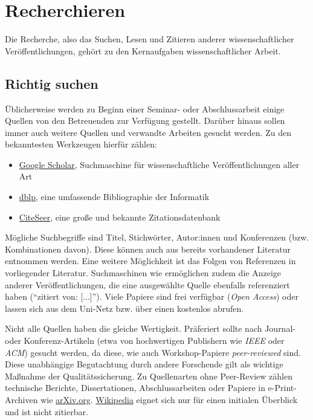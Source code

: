 \section{Recherchieren}%
\label{sec:Recherchieren}

Die Recherche, also das Suchen, Lesen und Zitieren anderer wissenschaftlicher Veröffentlichungen, gehört zu den Kernaufgaben wissenschaftlicher Arbeit.

\subsection{Richtig suchen}%
\label{sec:Recherchieren:Suchen}

Üblicherweise werden zu Beginn einer Seminar- oder Abschlussarbeit einige Quellen von den Betreuenden zur Verfügung gestellt.
Darüber hinaus sollen immer auch weitere Quellen und verwandte Arbeiten gesucht werden.
Zu den bekanntesten Werkzeugen hierfür zählen:

\smallskip
\begin{itemize}[label={\symbolTool}]
    \item \href{https://scholar.google.com/}{Google Scholar}, Suchmaschine für wissenschaftliche Veröffentlichungen aller Art
    \item \href{https://dblp.org/}{dblp}, eine umfassende Bibliographie der Informatik
    \item \href{https://citeseerx.ist.psu.edu/}{CiteSeer}, eine große und bekannte Zitationsdatenbank
\end{itemize}
\smallskip

\noindent
Mögliche Suchbegriffe sind Titel, Stichwörter, Autor:innen und Konferenzen (bzw. Kombinationen davon).
Diese können auch aus bereits vorhandener Literatur entnommen werden.
Eine weitere Möglichkeit ist das Folgen von Referenzen in vorliegender Literatur.
Suchmaschinen wie  ermöglichen zudem die Anzeige anderer Veröffentlichungen, die eine ausgewählte Quelle ebenfalls referenziert haben (\enquote{zitiert von: [...]}).
Viele Papiere sind frei verfügbar (\emph{Open Access}) oder lassen sich aus dem Uni-Netz bzw. über einen  kostenlos abrufen.

Nicht alle Quellen haben die gleiche Wertigkeit. 
Präferiert sollte nach Journal- oder Konferenz-Artikeln (etwa von hochwertigen Publishern wie \emph{IEEE} oder \emph{ACM}) gesucht werden, da diese, wie auch Workshop-Papiere \emph{peer-reviewed} sind. 
Diese unabhängige Begutachtung durch andere Forschende gilt als wichtige Maßnahme der Qualitätssicherung. 
Zu Quellenarten ohne Peer-Review zählen technische Berichte, Dissertationen, Abschlussarbeiten oder Papiere in e-Print-Archiven wie \href{https://arXiv.org}{arXiv.org}.  
\href{https://www.wikipedia.org/}{Wikipedia} eignet sich nur für einen initialen Überblick und ist nicht zitierbar.

